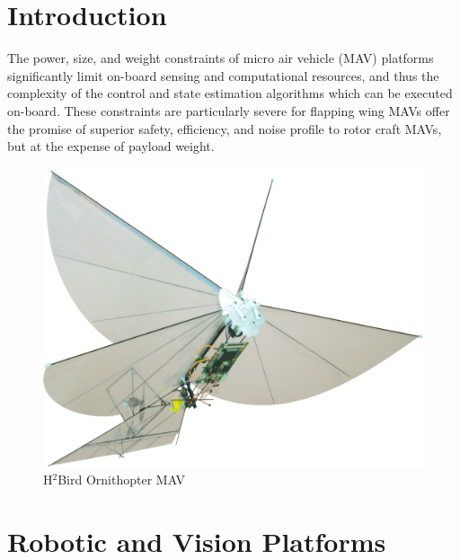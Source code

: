 \documentclass{aamas2013}
\begin{document}



\section{Introduction}
The power, size, and weight constraints of micro air vehicle (MAV) platforms significantly limit on-board sensing and computational resources, and thus the complexity of the control and state estimation algorithms which can be executed on-board. These constraints are particularly severe for flapping wing MAVs offer the promise of superior safety, efficiency, and noise profile to rotor craft MAVs, but at the expense of payload weight.
\begin{figure}[!tb]
\centering
\includegraphics[width=\linewidth]{figures/h2bird.png}
\caption{H$^2$Bird Ornithopter MAV}
\label{fig:h2bird}
\end{figure}

\section{Robotic and Vision Platforms}
\end{document}
